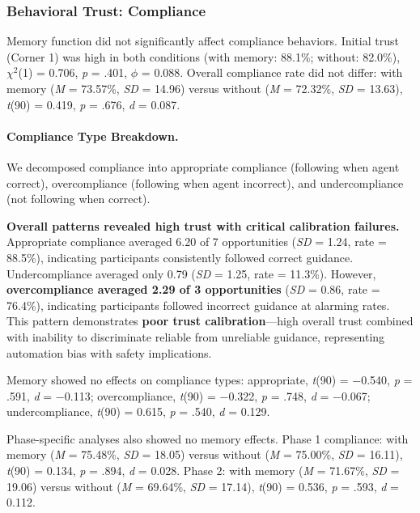 \documentclass[12pt]{article}
\begin{document}
\subsubsection{Behavioral Trust: Compliance}

Memory function did not significantly affect compliance behaviors. Initial trust (Corner 1) was high in both conditions (with memory: 88.1\%; without: 82.0\%), $\chi^2$(1) = 0.706, \textit{p} = .401, $\phi$ = 0.088. Overall compliance rate did not differ: with memory (\textit{M} = 73.57\%, \textit{SD} = 14.96) versus without (\textit{M} = 72.32\%, \textit{SD} = 13.63), \textit{t}(90) = 0.419, \textit{p} = .676, \textit{d} = 0.087.

\paragraph{Compliance Type Breakdown.}
We decomposed compliance into appropriate compliance (following when agent correct), overcompliance (following when agent incorrect), and undercompliance (not following when correct).

\textbf{Overall patterns revealed high trust with critical calibration failures.} Appropriate compliance averaged 6.20 of 7 opportunities (\textit{SD} = 1.24, rate = 88.5\%), indicating participants consistently followed correct guidance. Undercompliance averaged only 0.79 (\textit{SD} = 1.25, rate = 11.3\%). However, \textbf{overcompliance averaged 2.29 of 3 opportunities} (\textit{SD} = 0.86, rate = 76.4\%), indicating participants followed incorrect guidance at alarming rates. This pattern demonstrates \textbf{poor trust calibration}---high overall trust combined with inability to discriminate reliable from unreliable guidance, representing automation bias with safety implications.

Memory showed no effects on compliance types: appropriate, \textit{t}(90) = $-$0.540, \textit{p} = .591, \textit{d} = $-$0.113; overcompliance, \textit{t}(90) = $-$0.322, \textit{p} = .748, \textit{d} = $-$0.067; undercompliance, \textit{t}(90) = 0.615, \textit{p} = .540, \textit{d} = 0.129.

Phase-specific analyses also showed no memory effects. Phase 1 compliance: with memory (\textit{M} = 75.48\%, \textit{SD} = 18.05) versus without (\textit{M} = 75.00\%, \textit{SD} = 16.11), \textit{t}(90) = 0.134, \textit{p} = .894, \textit{d} = 0.028. Phase 2: with memory (\textit{M} = 71.67\%, \textit{SD} = 19.06) versus without (\textit{M} = 69.64\%, \textit{SD} = 17.14), \textit{t}(90) = 0.536, \textit{p} = .593, \textit{d} = 0.112.
\end{document}
